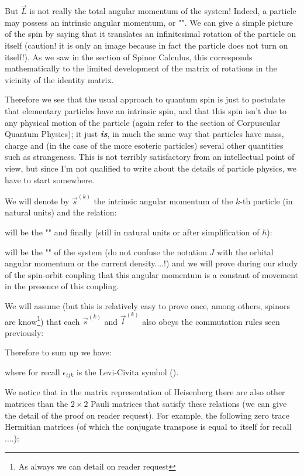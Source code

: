 	But $\vec{L}$ is not really the total angular momentum of the system! Indeed, a particle may possess an intrinsic angular momentum, or "". We can give a simple picture of the spin by saying that it translates an infinitesimal rotation of the particle on itself (caution! it is only an image because in fact the particle does not turn on itself!). As we saw in the section of Spinor Calculus, this corresponds mathematically to the limited development of the matrix of rotations in the vicinity of the identity matrix.
	
	Therefore we see that the usual approach to quantum spin is just to postulate that elementary particles have an intrinsic spin, and that this spin isn't due to any physical motion of the particle (again refer to the section of Corpuscular Quantum Physics); it just \textbf{\textit{is}}, in much the same way that particles have mass, charge and (in the case of the more esoteric particles) several other quantities such as strangeness. This is not terribly satisfactory from an intellectual point of view, but since I'm not qualified to write about the details of particle physics, we have to start somewhere.
	
	We will denote by $\vec{s}^{(k)}$ the intrinsic angular momentum of the $k$-th particle (in natural units) and the relation:
	
	will be the "" and finally (still in natural units or after simplification of $\hbar$):
	
	will be the "" of the system (do not confuse the notation $J$ with the orbital angular momentum or the current density....!) and we will prove during our study of the spin-orbit coupling that this angular momentum is a constant of movement in the presence of this coupling.
	
	We will assume (but this is relatively easy to prove once, among others, spinors are know\footnote{As always we can detail on reader request}) that each $\vec{s}^{(k)}$ and $\vec{l}^{(k)}$ also obeys the commutation rules seen previously:
	
	Therefore to sum up we have:
	
	where for recall $\epsilon_{ijk}$ is the Levi-Civita symbol ().
	
	We notice that in the matrix representation of Heisenberg there are also other matrices than the $2\times 2$ Pauli matrices that satisfy these relations (we can give the detail of the proof on reader request). For example, the following zero trace Hermitian matrices (of which the conjugate transpose is equal to itself for recall ....):
	
